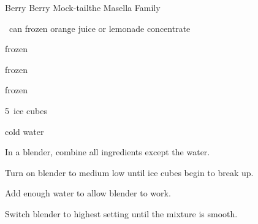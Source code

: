 \begin{recipe}{Berry Berry Mock-tail}{the Masella Family}{}

\begin{ingredients}
\item \half~can frozen orange juice or lemonade concentrate
\item \C{\half} frozen 
\item \C{\half} frozen 
\item \C{\half} frozen 
\item 5~ice cubes
\item cold water
\end{ingredients}

\begin{directions}
\item In a blender, combine all ingredients except the water.
\item Turn on blender to medium low until ice cubes begin to break up.
\item Add enough water to allow blender to work.
\item Switch blender to highest setting until the mixture is smooth.
\end{directions}

\end{recipe}
